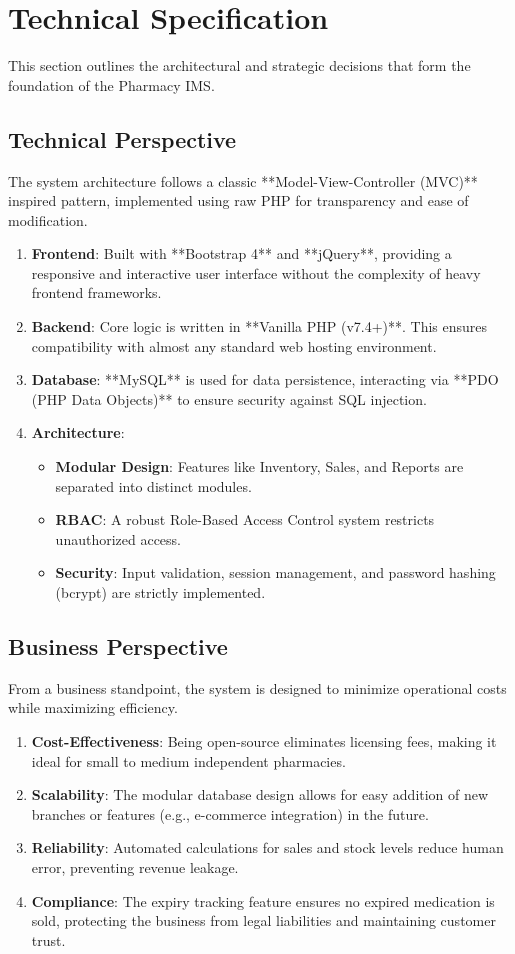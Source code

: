 \documentclass[12pt,a4paper]{article}
\begin{document}
\section{Technical Specification}
This section outlines the architectural and strategic decisions that form the foundation of the Pharmacy IMS.

\subsection{Technical Perspective}
The system architecture follows a classic **Model-View-Controller (MVC)** inspired pattern, implemented using raw PHP for transparency and ease of modification.
\begin{enumerate}
    \item \textbf{Frontend}: Built with **Bootstrap 4** and **jQuery**, providing a responsive and interactive user interface without the complexity of heavy frontend frameworks.
    \item \textbf{Backend}: Core logic is written in **Vanilla PHP (v7.4+)**. This ensures compatibility with almost any standard web hosting environment.
    \item \textbf{Database}: **MySQL** is used for data persistence, interacting via **PDO (PHP Data Objects)** to ensure security against SQL injection.
    \item \textbf{Architecture}:
    \begin{itemize}
        \item \textbf{Modular Design}: Features like Inventory, Sales, and Reports are separated into distinct modules.
        \item \textbf{RBAC}: A robust Role-Based Access Control system restricts unauthorized access.
        \item \textbf{Security}: Input validation, session management, and password hashing (bcrypt) are strictly implemented.
    \end{itemize}
\end{enumerate}

\subsection{Business Perspective}
From a business standpoint, the system is designed to minimize operational costs while maximizing efficiency.
\begin{enumerate}
    \item \textbf{Cost-Effectiveness}: Being open-source eliminates licensing fees, making it ideal for small to medium independent pharmacies.
    \item \textbf{Scalability}: The modular database design allows for easy addition of new branches or features (e.g., e-commerce integration) in the future.
    \item \textbf{Reliability}: Automated calculations for sales and stock levels reduce human error, preventing revenue leakage.
    \item \textbf{Compliance}: The expiry tracking feature ensures no expired medication is sold, protecting the business from legal liabilities and maintaining customer trust.
\end{enumerate}
\end{document}
